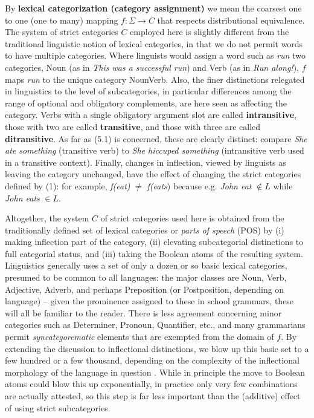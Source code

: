 By {\bf lexical categorization (category assignment)} we mean the coarsest one
to one (one to many) mapping $f: \Sigma \rightarrow C$ that respects
distributional equivalence. The system of strict categories $C$ employed here
is slightly different from the traditional linguistic notion of lexical
categories, in that we do not permit words to have multiple categories. Where
linguists would assign a word such as {\it run} two categories, Noun (as in
{\it This was a successful run}) and Verb (as in {\it Run along!}), $f$ maps
{\it run} to the unique category NounVerb. Also, the finer distinctions
relegated in linguistics to the level of subcategories, in particular
differences among the range of optional and obligatory complements, are here
seen as affecting the category.  Verbs with a single obligatory argument slot
are called {\bf intransitive}, those with two are called {\bf transitive}, and
those with three are called {\bf ditransitive}.  
  As far as (5.1) is
concerned, these are clearly distinct: compare {\it She ate something}
(transitive verb) to {\it *She hiccuped something} (intransitive verb used in
a transitive context). Finally, changes in inflection, viewed by linguists as
leaving the category unchanged, have the effect of changing the strict
categories defined by (1): for example, {\it f(eat)} $\neq$ {\it f(eats})
because e.g. {\it John eat} $\not\in L$ while {\it John eats} $\in L$.
 

Altogether, the system $C$ of strict categories used here is obtained from the
traditionally defined set of lexical categories or {\it parts of speech} (POS)
by (i) making inflection part of the category, (ii) elevating subcategorial
distinctions to full categorial status, and (iii) taking the Boolean atoms of
the resulting system.  Linguistics generally uses a set of only a dozen or so
basic lexical categories, presumed to be common to all languages: the major
classes are Noun, Verb, Adjective, Adverb, and perhaps Preposition (or
Postposition, depending on language) -- given the prominence assigned to these
in school grammars, these will all be familiar to the reader. There is less
agreement concerning minor categories such as Determiner, Pronoun, Quantifier,
etc., and many grammarians permit {\it syncategorematic} elements that are
exempted from the domain of $f$.  By extending the discussion to inflectional
distinctions, we blow up this basic set to a few hundred or a few thousand,
depending on the complexity of the inflectional morphology of the language in
question \cite{Spencer:1998}.  While in principle the move to Boolean atoms
could blow this up exponentially, in practice only very few combinations are
actually attested, so this step is far less important than the (additive)
effect of using strict subcategories. 

